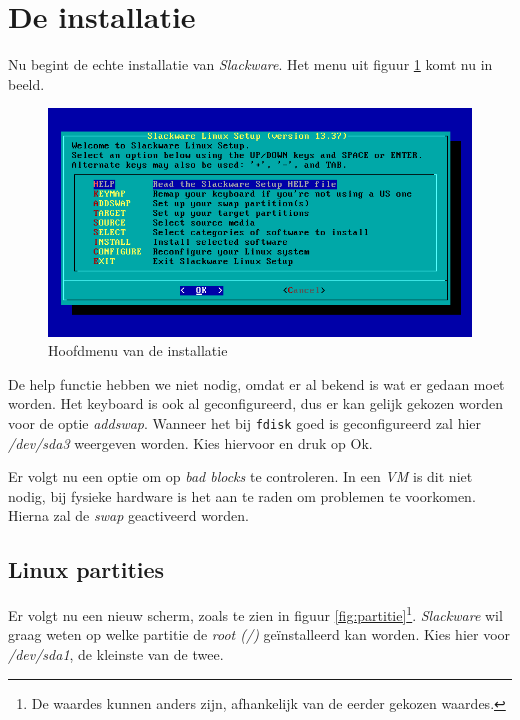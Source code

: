 \section{De installatie}
Nu begint de echte installatie van \emph{Slackware}. Het menu uit figuur \ref{fig:setup2} komt nu in beeld.
\begin{figure}[H]
  \begin{center}
    \includegraphics[scale=0.5]{images/01_installer}
  \end{center}
  \caption{Hoofdmenu van de installatie}
  \label{fig:setup2}
\end{figure}
De help functie hebben we niet nodig, omdat er al bekend is wat er gedaan moet worden. Het keyboard is ook al geconfigureerd, dus er kan gelijk gekozen worden voor de optie \emph{addswap}. Wanneer het bij \texttt{fdisk} goed is geconfigureerd zal hier \emph{/dev/sda3} weergeven worden. Kies hiervoor en druk op Ok. 

Er volgt nu een optie om op \emph{bad blocks} te controleren. In een \emph{VM} is dit niet nodig, bij fysieke hardware is het aan te raden om problemen te voorkomen. Hierna zal de \emph{swap} geactiveerd worden.

\subsection{Linux partities}
Er volgt nu een nieuw scherm, zoals te zien in figuur \ref{fig:partitie}\footnote{De waardes kunnen anders zijn, afhankelijk van de eerder gekozen waardes.}. \emph{Slackware} wil graag weten op welke partitie de \emph{root (/)} ge\"{i}nstalleerd kan worden. Kies hier voor \emph{/dev/sda1}, de kleinste van de twee. 

